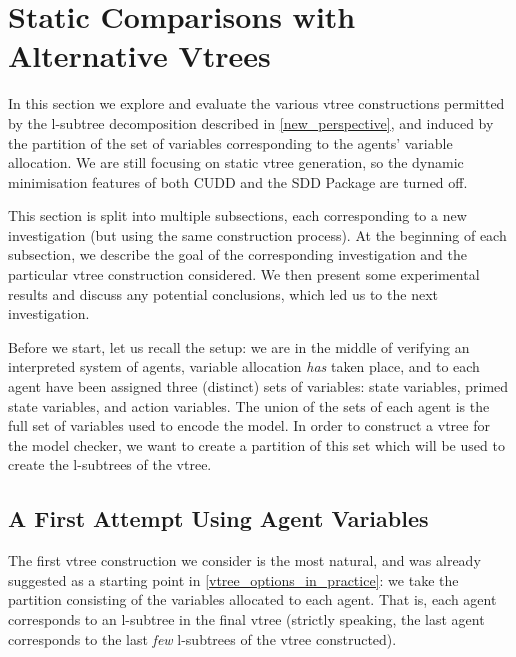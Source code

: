 \documentclass[11pt]{report}
\begin{document}
\section{Static Comparisons with Alternative Vtrees}
\label{alternative}

In this section we explore and evaluate the various vtree constructions permitted by the l-subtree decomposition described in \ref{new_perspective}, and induced by the partition of the set of variables corresponding to the agents' variable allocation. We are still focusing on static vtree generation, so the dynamic minimisation features of both CUDD and the SDD Package are turned off.

This section is split into multiple subsections, each corresponding to a new investigation (but using the same construction process). At the beginning of each subsection, we describe the goal of the corresponding investigation and the particular vtree construction considered. We then present some experimental results and discuss any potential conclusions, which led us to the next investigation. 

Before we start, let us recall the setup: we are in the middle of verifying an interpreted system of agents, variable allocation \textit{has} taken place, and to each agent have been assigned three (distinct) sets of variables: state variables, primed state variables, and action variables. The union of the sets of each agent is the full set of variables used to encode the model. In order to construct a vtree for the model checker, we want to create a partition of this set which will be used to create the l-subtrees of the vtree. 

\subsection{A First Attempt Using Agent Variables}
\label{first_attempt}

The first vtree construction we consider is the most natural, and was already suggested as a starting point in \ref{vtree_options_in_practice}: we take the partition consisting of the variables allocated to each agent. That is, each agent corresponds to an l-subtree in the final vtree (strictly speaking, the last agent corresponds to the last \textit{few }l-subtrees of the vtree constructed). 
\end{document}
